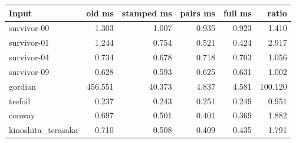 \begin{center}
\begin{tabular}{@{}lrrrrr@{}}
\toprule
Input & old ms & stamped ms & pairs ms & full ms & ratio \\
\midrule
survivor-00 & 1.303 & 1.007 & 0.935 & 0.923 & 1.410 \\
survivor-01 & 1.244 & 0.754 & 0.521 & 0.424 & 2.917 \\
survivor-04 & 0.734 & 0.678 & 0.718 & 0.703 & 1.056 \\
survivor-09 & 0.628 & 0.593 & 0.625 & 0.631 & 1.002 \\
gordian & 456.551 & 40.373 & 4.837 & 4.581 & 100.120 \\
trefoil & 0.237 & 0.243 & 0.251 & 0.249 & 0.951 \\
conway & 0.697 & 0.501 & 0.401 & 0.369 & 1.882 \\
kinoshita\_terasaka & 0.710 & 0.508 & 0.409 & 0.435 & 1.791 \\
\bottomrule
\end{tabular}
\end{center}
